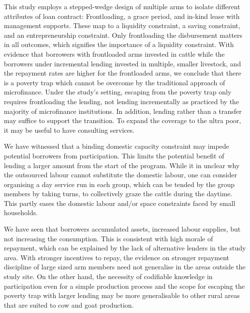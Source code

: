 	This study employs a stepped-wedge design of multiple arms to isolate different attributes of loan contract: Frontloading, a grace period, and in-kind lease with management supports. These map to a liquidity constraint, a saving constraint, and an entrepreneurship constraint. Only frontloading the disbursement matters in all outcomes, which signifies the importance of a liquidity constraint. With evidence that borrowers with frontloaded arms invested in cattle while the borrowers under incremental lending invested in multiple, smaller livestock, and the repayment rates are higher for the frontloaded arms, we conclude that there is a poverty trap which cannot be overcome by the traditional approach of microfinance. Under the study's setting, escaping from the poverty trap only requires frontloading the lending, not lending incrementally as practiced by the majority of microfinance institutions. In addition, lending rather than a transfer may suffice to support the transition. To expand the coverage to the ultra poor, it may be useful to have consulting services.
	
	We have witnessed that a binding domestic capacity constraint may impede potential borrowers from participation. This limits the potential benefit of lending a larger amount from the start of the program. While it in unclear why the outsourced labour cannot substitute the domestic labour, one can consider organising a day service run in each group, which can be tended by the group members by taking turns, to collectively graze the cattle during the daytime. This partly eases the domestic labour and/or space constraints faced by small households. 

	We have seen that borrowers accumulated assets, increased labour supplies, but not increasing the consumption. This is consistent with high morale of repayment, which can be explained by the lack of alternative lenders in the study area. With stronger incentives to repay, the evidence on stronger repayment discipline of large sized arm members need not generalise in the areas outside the study site. On the other hand, the necessity of codifiable knowledge in participation even for a simple production process and the scope for escaping the poverty trap with larger lending may be more generalisable to other rural areas that are suited to cow and goat production.



{\footnotesize
\setlength{\baselineskip}{8pt}

}

